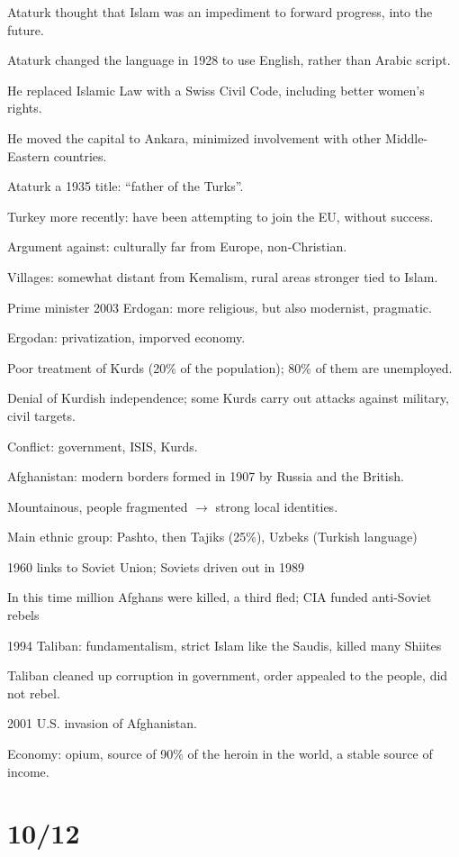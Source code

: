 \documentclass[12pt]{article}
\begin{document}
Ataturk thought that Islam was an impediment to forward progress, into the future.

Ataturk changed the language in 1928 to use English, rather than Arabic script.

He replaced Islamic Law with a Swiss Civil Code, including better women's rights.

He moved the capital to Ankara, minimized involvement with other Middle-Eastern countries.

Ataturk a 1935 title: ``father of the Turks''.

\noindent
Turkey more recently: have been attempting to join the EU, without success.

Argument against: culturally far from Europe, non-Christian.

Villages: somewhat distant from Kemalism, rural areas stronger tied to Islam.

Prime minister 2003 Erdogan: more religious, but also modernist, pragmatic.

Ergodan: privatization, imporved economy.

Poor treatment of Kurds (20\% of the population); 80\% of them are unemployed.

Denial of Kurdish independence; some Kurds carry out attacks against military, civil targets.

Conflict: government, ISIS, Kurds.

\noindent
Afghanistan: modern borders formed in 1907 by Russia and the British.

Mountainous, people fragmented $\to$ strong local identities.

Main ethnic group: Pashto, then Tajiks (25\%), Uzbeks (Turkish language)

1960 links to Soviet Union; Soviets driven out in 1989

In this time million Afghans were killed, a third fled; CIA funded anti-Soviet rebels

1994 Taliban: fundamentalism, strict Islam like the Saudis, killed many Shiites

Taliban cleaned up corruption in government, order appealed to the people, did not rebel.

2001 U.S. invasion of Afghanistan.

Economy: opium, source of 90\% of the heroin in the world, a stable source of income.

\section{10/12}
\end{document}
